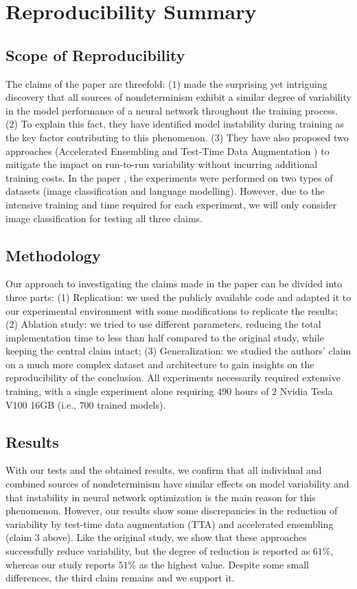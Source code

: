 \section{Reproducibility Summary}

\subsection*{Scope of Reproducibility}
The claims of the paper \cite{summers:2021} are threefold: (1) \cite{summers:2021} made the surprising yet intriguing discovery that all sources of nondeterminism exhibit a similar degree of variability in the model performance of a neural network throughout the training process. (2) To explain this fact, they have identified model instability during training as the key factor contributing to this phenomenon. (3) They have also proposed two approaches (Accelerated Ensembling \cite{wen:2020} and Test-Time Data Augmentation \cite{szegedy:2015}) to mitigate the impact on run-to-run variability without incurring additional training costs. In the paper \cite{summers:2021}, the experiments were performed on two types of datasets (image classification and language modelling). However, due to the intensive training and time required for each experiment, we will only consider image classification for testing all three claims.
 

\subsection*{Methodology}

Our approach to investigating the claims made in the paper \cite{summers:2021} can be divided into three parts: (1) Replication: we used the publicly available code and adapted it to our experimental environment with some modifications to replicate the results; (2) Ablation study: we tried to use different parameters, reducing the total implementation time to less than half compared to the original study, while keeping the central claim intact; (3) Generalization: we studied the authors' claim on a much more complex dataset and architecture to gain insights on the reproducibility of the conclusion. 
All experiments necessarily required extensive training, with a single experiment alone requiring $490$ hours of $2$ Nvidia Tesla V100 16GB (i.e., $700$ trained models).


\subsection*{Results}
With our tests and the obtained results, we confirm that all individual and combined sources of nondeterminism have similar effects on model variability and that instability in neural network optimization is the main reason for this phenomenon. However, our results show some discrepancies in the reduction of variability by test-time data augmentation (TTA) and accelerated ensembling (claim 3 above). Like the original study, we show that these approaches successfully reduce variability, but the degree of reduction is reported as $61\%$, whereas our study reports $51\%$ as the highest value. Despite some small differences, the third claim remains and we support it.


